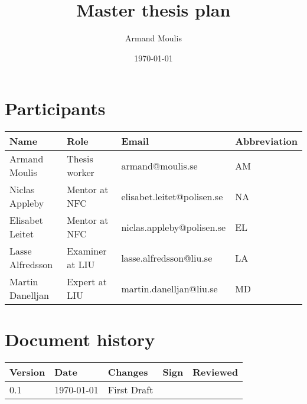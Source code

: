 \documentclass{article}
\begin{document}
	



\title{Master thesis plan}
\author{Armand Moulis}
\date{\today}
\maketitle
\newpage

\section*{Participants}

\begin{center}

	\begin{tabular}{|l|l|l|l|}
		\hline
		Name             & Role            & Email                      & Abbreviation \\ \hline
		Armand Moulis    & Thesis worker   & armand@moulis.se           & AM           \\ \hline
		Niclas Appleby   & Mentor at NFC   & elisabet.leitet@polisen.se & NA           \\ \hline
		Elisabet Leitet  & Mentor at NFC   & niclas.appleby@polisen.se  & EL           \\ \hline
		Lasse Alfredsson & Examiner at LIU & lasse.alfredsson@liu.se    & LA           \\ \hline
		Martin Danelljan & Expert at LIU   & martin.danelljan@liu.se    & MD           \\ \hline
	\end{tabular}
\end{center}
\newpage


\newpage
\setcounter{tocdepth}{3}
\tableofcontents
\newpage

\section*{Document history}
\begin{center}
	\begin{tabular}{|l|l| p{5cm} |l|l| }
		\hline
		Version &  Date  & Changes     & Sign & Reviewed \\ \hline
		  0.1   & \today & First Draft &    &  \\ \hline
	\end{tabular}
\end{center}
\newpage

\setcounter{page}{1}
\end{document}
